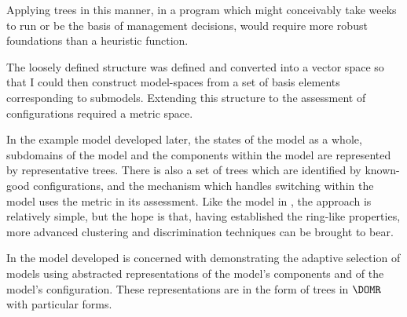 Applying trees in this manner, in a program which might conceivably
take weeks to run or be the basis of management decisions, would
require more robust foundations than a heuristic function.

The loosely defined structure was defined and converted into a vector
space so that I could then construct model-spaces from a set of basis
elements corresponding to submodels. Extending this structure to the
assessment of configurations required a metric space.

In the example model developed later, the states of the model as a
whole, subdomains of the model and the components within the model are
represented by representative trees.  There is also a set of trees
which are identified by known-good configurations, and the
mechanism which handles switching within the model uses the metric in
its assessment.  Like the model in \Ctwo, the
approach is relatively simple, but the hope is that, having established
the ring-like properties, more advanced clustering and
discrimination techniques can be brought to bear.

In \Cthree the model developed is concerned with
demonstrating the adaptive selection of models using abstracted
representations of the model's components and of the model's
configuration. These representations are in the form of trees in
$\DOMR$ with particular forms.






